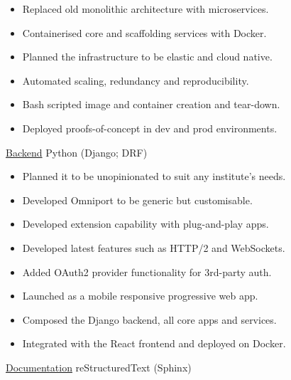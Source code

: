 \begin{sectiondescription}
  \begin{itemize}[nosep, leftmargin = *]
    \item Replaced old monolithic architecture with microservices.
    \item Containerised core and scaffolding services with Docker.
    \item Planned the infrastructure to be elastic and cloud native.
    \item Automated scaling, redundancy and reproducibility.
    \item Bash scripted image and container creation and tear-down.
    \item Deployed proofs-of-concept in dev and prod environments.
  \end{itemize}
\end{sectiondescription}

\projectsubsubsection
  {\href{https://github.com/IMGIITRoorkee/omniport-backend/}{Backend}}
  {Python (Django; DRF)}

\begin{sectiondescription}
  \begin{itemize}[nosep, leftmargin = *]
    \item Planned it to be unopinionated to suit any institute's needs.
    \item Developed Omniport to be generic but customisable.
    \item Developed extension capability with plug-and-play apps.
    \item Developed latest features such as HTTP/2 and WebSockets.
    \item Added OAuth2 provider functionality for 3rd-party auth.
    \item Launched as a mobile responsive progressive web app.
    \item Composed the Django backend, all core apps and services.
    \item Integrated with the React frontend and deployed on Docker.
  \end{itemize}
\end{sectiondescription}

\projectsubsubsection
  {\href{https://github.com/IMGIITRoorkee/omniport-docs/}{Documentation}}
  {reStructuredText (Sphinx)}

